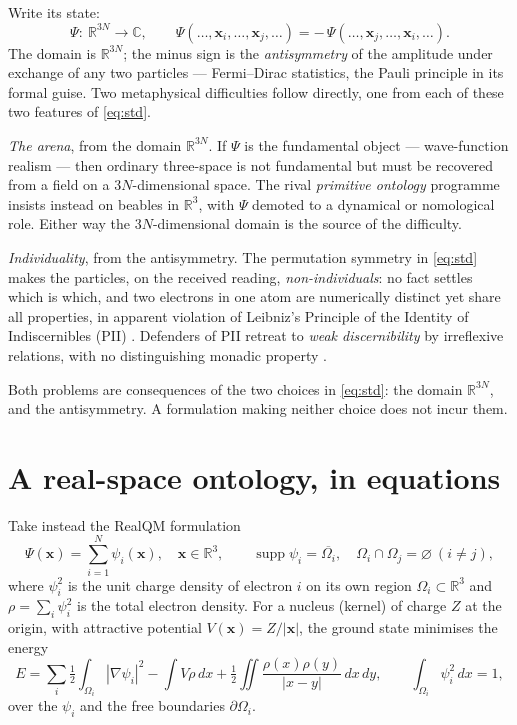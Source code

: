 \documentclass[11pt]{article}
\begin{document}
Write its state:
\begin{equation}
\Psi:\ \mathbb R^{3N}\to\mathbb C,\qquad
\Psi(\dots,\mathbf x_i,\dots,\mathbf x_j,\dots)=-\,\Psi(\dots,\mathbf x_j,\dots,\mathbf x_i,\dots).
\label{eq:std}
\end{equation}
The domain is $\mathbb R^{3N}$; the minus sign is the \emph{antisymmetry} of the amplitude under exchange of
any two particles --- Fermi--Dirac statistics, the Pauli principle in its formal guise. Two metaphysical
difficulties follow directly, one from each of these two features of \eqref{eq:std}.

\emph{The arena}, from the domain $\mathbb R^{3N}$. If $\Psi$ is the fundamental object --- wave-function
realism \cite{Albert1996,NeyAlbert2013,Ney2021} --- then ordinary three-space is not fundamental but must
be recovered from a field on a $3N$-dimensional space. The rival \emph{primitive ontology} programme
\cite{Maudlin2007,Allori2013,DGZ1992} insists instead on beables in $\mathbb R^3$, with $\Psi$ demoted to
a dynamical or nomological role. Either way the $3N$-dimensional domain is the source of the difficulty.

\emph{Individuality}, from the antisymmetry. The permutation symmetry in \eqref{eq:std} makes the
particles, on the received reading, \emph{non-individuals}: no fact settles which is which, and two
electrons in one atom are numerically distinct yet share all properties, in apparent violation of
Leibniz's Principle of the Identity of Indiscernibles (PII) \cite{FrenchKrause2006,FrenchSEP}. Defenders of
PII retreat to \emph{weak discernibility} by irreflexive relations, with no distinguishing monadic
property \cite{Saunders2006,MullerSaunders2008}.

Both problems are consequences of the two choices in \eqref{eq:std}: the domain $\mathbb R^{3N}$, and the
antisymmetry. A formulation making neither choice does not incur them.

\section{A real-space ontology, in equations}
\label{sec:po}

Take instead the RealQM formulation \cite{RealQM}
\begin{equation}
\Psi(\mathbf x)=\sum_{i=1}^N\psi_i(\mathbf x),\quad \mathbf x\in\mathbb R^3,\qquad
\operatorname{supp}\psi_i=\overline{\Omega_i},\quad \Omega_i\cap\Omega_j=\varnothing\ (i\neq j),
\label{eq:real}
\end{equation}
where $\psi_i^2$ is the unit charge density of electron $i$ on its own region $\Omega_i\subset\mathbb R^3$
and $\rho=\sum_i\psi_i^2$ is the total electron density. For a nucleus (kernel) of charge $Z$ at the
origin, with attractive potential $V(\mathbf x)=Z/|\mathbf x|$, the ground state minimises the energy
\begin{equation}
E=\sum_i\tfrac12\!\int_{\Omega_i}|\nabla\psi_i|^2
-\int V\rho\,dx
+\tfrac12\!\iint\frac{\rho(x)\rho(y)}{|x-y|}\,dx\,dy,\qquad
\int_{\Omega_i}\psi_i^2\,dx=1,
\label{eq:E}
\end{equation}
over the $\psi_i$ and the free boundaries $\partial\Omega_i$.
\end{document}
